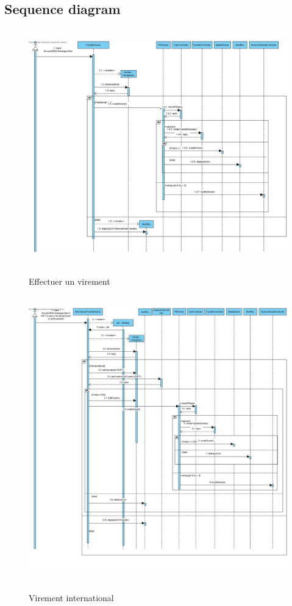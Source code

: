 \documentclass[]{report}
\begin{document}
\newpage

\subsection{Sequence diagram}

\begin{figure}[h!]
	\hbox{
		\centering\includegraphics[width=\linewidth]{img/Sequence 1 - Extension 2.jpg}
	}
	\caption{Effectuer un virement}
	\end{figure}

\newpage

\begin{figure}[h!]
	\hbox{
		\centering\includegraphics[width=\linewidth]{img/Sequence 2 - Extension 2.jpg}
	}
	\caption{Virement international}
	\end{figure}
\end{document}
